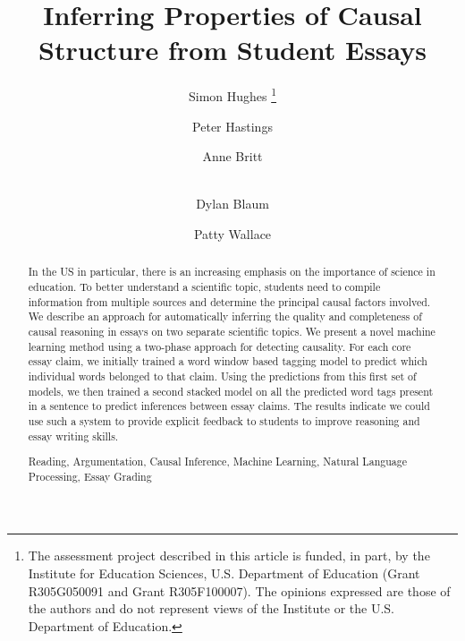 \documentclass[runningheads,a4paper]{llncs}
\newcommand{\keywords}[1]{\par\addvspace\baselineskip
\noindent\keywordname\enspace\ignorespaces#1}
\begin{document}
\mainmatter  %

\title{Inferring Properties of Causal Structure from Student
Essays}


%
%
\author{Simon Hughes%
\thanks{The assessment project described in this article is funded, in part, by the Institute for Education Sciences, U.S. Department of Education (Grant R305G050091 and Grant R305F100007). The opinions expressed are those of the authors and do not represent views of the Institute or the U.S. Department of Education.}%
\and Peter Hastings \and Anne Britt\and \\ Dylan Blaum
 \and Patty Wallace}

%
%

\maketitle


\begin{abstract}
In the US in particular, there is an increasing emphasis on the importance of
science in education. To better understand a scientific topic, students need
to compile information from multiple sources and determine the principal causal
factors involved. We describe an approach for automatically inferring the
quality and completeness of causal reasoning in essays on two separate
scientific topics. We present a novel machine learning method using a two-phase
approach for detecting causality. For each core essay claim, we initially
trained a word window based tagging model to predict which individual words
belonged to that claim. Using the predictions from this first set of models,
we then trained a second stacked model on all the predicted word tags present in
a sentence to predict inferences between essay claims. The results indicate we
could use such a system to provide explicit feedback to students to improve
reasoning and essay writing skills. 
\keywords{Reading, Argumentation, Causal Inference, Machine Learning, Natural Language Processing, Essay Grading}
\end{abstract}
\end{document}
